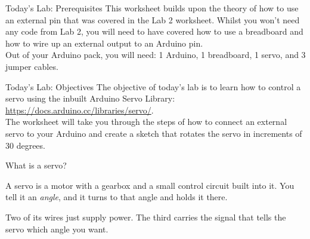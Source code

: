 \documentclass[aspectratio=169]{beamer}
\begin{document}
\begin{frame}{Today's Lab: Prerequisites}
    \Large
    This worksheet builds upon the theory of how to use an external pin that was covered in the Lab 2 worksheet. Whilst you won't need any code from Lab 2, you will need to have covered how to use a breadboard and how to wire up an external output to an Arduino pin. \\

    Out of your Arduino pack, you will need: 1 Arduino, 1 breadboard, 1 servo, and 3 jumper cables.
\end{frame}

\begin{frame}{Today's Lab: Objectives}
    \Large
    The objective of today's lab is to learn how to control a servo using the inbuilt Arduino Servo Library: \url{https://docs.arduino.cc/libraries/servo/}.\\

    The worksheet will take you through the steps of how to connect an external servo to your Arduino and create a sketch that rotates the servo in increments of 30 degrees.
\end{frame}

\begin{frame}{What is a servo?}
    \begin{center}
    \end{center}

    \vspace{.5em}
    A servo is a motor with a gearbox and a small control circuit built into it. You tell it an \emph{angle}, and it turns to that angle and holds it there.

    \vspace{.5em}
    Two of its wires just supply power. The third carries the signal that tells the servo which angle you want.
\end{frame}
\end{document}

